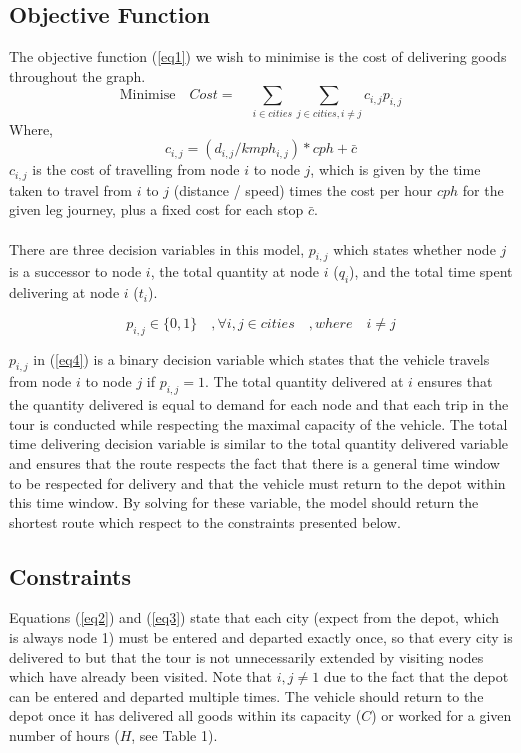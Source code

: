 \documentclass[a4paper,11pt]{article}
\begin{document}
\subsection{Objective Function}

The objective function (\ref{eq1}) we wish to minimise is the cost of delivering goods throughout the graph.
\begin{equation}\label{eq1}
\textrm{Minimise}\quad  Cost = \quad \sum\limits_{i \in cities} \sum\limits_{j \in cities, i \neq j} c_{i,j}p_{i,j}
\end{equation}
Where, $$c_{i,j} = (d_{i,j}/kmph_{i,j})*cph + \bar{c}$$
$c_{i,j}$ is the cost of travelling from node $i$ to node $j$, which is given by the time taken to travel from $i$ to $j$ (distance / speed) times the cost per hour $cph$ for the given leg journey, plus a fixed cost for each stop $\bar{c}$. 
\\\\
There are three decision variables in this model, $p_{i,j}$ which states whether node $j$ is a successor to node $i$, the total quantity at node $i$ ($q_{i}$), and the total time spent delivering at node $i$ ($t_{i}$).

\begin{equation}\label{eq4}
p_{i,j} \in{\{0,1\}} \quad , \forall i,j \in cities\quad, where \quad i \neq j
\end{equation}

$p_{i,j}$ in (\ref{eq4}) is a binary decision variable which states that the vehicle travels from node $i$ to node $j$ if $p_{i,j}=1$. The total quantity delivered at $i$ ensures that the quantity delivered is equal to demand for each node and that each trip in the tour is conducted while respecting the maximal capacity of the vehicle. The total time delivering decision variable is similar to the total quantity delivered variable and ensures that the route respects the fact that there is a general time window to be respected for delivery and that the vehicle must return to the depot within this time window. By solving for these variable, the model should return the shortest route which respect to the constraints presented below.

\subsection{Constraints}

Equations (\ref{eq2}) and (\ref{eq3}) state that each city (expect from the depot, which is always node 1) must be entered and departed exactly once, so that every city is delivered to but that the tour is not unnecessarily extended by visiting nodes which have already been visited. Note that $i,j\neq1$ due to the fact that the depot can be entered and departed multiple times. The vehicle should return to the depot once it has delivered all goods within its capacity ($C$) or worked for a given number of hours ($H$, see Table 1). 
\end{document}
